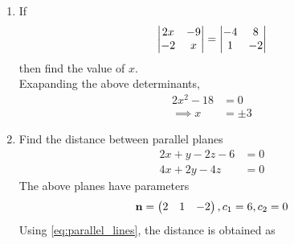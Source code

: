 \documentclass[journal,12pt,twocolumn]{IEEEtran}
\renewcommand\thesection{\arabic{section}}
\begin{document}
\begin{enumerate}[label=\thesection.\arabic*.,ref=\thesection.\theenumi]
\item  If 
%
\begin{align}
	\begin{vmatrix} 2x & -9 \\ -2 & x \end{vmatrix} = \begin{vmatrix} -4 & 8 \\ 1 & -2\end{vmatrix} 
\end{align}
then find the value of $x$. 
\\
\solution
Exapanding the above determinants,
\begin{align}
	2x^2 - 18 &= 0
	\\
	\implies x &= \pm 3
\end{align}
\item  Find the distance between parallel planes 
	\begin{align}
		2x+y-2z-6&=0 
		\\
		4x+2y-4z&=0 
\end{align}
\solution The above planes have parameters
	\begin{align}
		\mathbf{n} = \begin{pmatrix}2 & 1 & -2\end{pmatrix}, c_1=6, c_2 = 0
\end{align}
Using 	\eqref{eq:parallel_lines},  the distance is obtained as


\end{enumerate}
\end{document}
